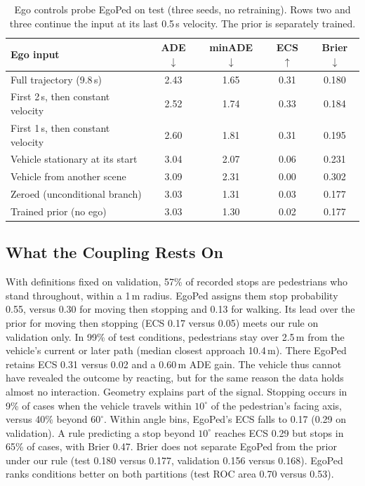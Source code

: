 \documentclass[letterpaper, 10 pt, conference]{ieeeconf}
\newcommand{\method}{EgoPed\xspace}
\begin{document}
\begin{table}[t]
  \centering
  \caption{Ego controls probe \method on test (three seeds, no retraining). Rows two and three continue the input at its last 0.5\,s velocity. The prior is separately trained.}
  \label{tab:controls}
  \vspace{3pt}
  \footnotesize
  \setlength{\tabcolsep}{3pt}
  \begin{tabular}{lcccc}
    \toprule
    Ego input & ADE $\downarrow$ & minADE $\downarrow$ & ECS $\uparrow$ & Brier $\downarrow$ \\
    \midrule
    Full trajectory (9.8\,s) & 2.43 & 1.65 & 0.31 & 0.180 \\
    First 2\,s, then constant velocity & 2.52 & 1.74 & 0.33 & 0.184 \\
    First 1\,s, then constant velocity & 2.60 & 1.81 & 0.31 & 0.195 \\
    Vehicle stationary at its start & 3.04 & 2.07 & 0.06 & 0.231 \\
    Vehicle from another scene & 3.09 & 2.31 & 0.00 & 0.302 \\
    Zeroed (unconditional branch) & 3.03 & 1.31 & 0.03 & 0.177 \\
    \midrule
    Trained prior (no ego) & 3.03 & 1.30 & 0.02 & 0.177 \\
    \bottomrule
  \end{tabular}
\end{table}

\subsection{What the Coupling Rests On}
\label{sec:rests}

With definitions fixed on validation, 57\% of recorded stops are pedestrians who stand throughout, within a 1\,m radius. \method assigns them stop probability 0.55, versus 0.30 for moving then stopping and 0.13 for walking. Its lead over the prior for moving then stopping (ECS 0.17 versus 0.05) meets our rule on validation only.
In 99\% of test conditions, pedestrians stay over 2.5\,m from the vehicle's current or later path (median closest approach 10.4\,m). There \method retains ECS 0.31 versus 0.02 and a 0.60\,m ADE gain. The vehicle thus cannot have revealed the outcome by reacting, but for the same reason the data holds almost no interaction.
Geometry explains part of the signal. Stopping occurs in 9\% of cases when the vehicle travels within $10^\circ$ of the pedestrian's facing axis, versus 40\% beyond $60^\circ$. Within angle bins, \method's ECS falls to 0.17 (0.29 on validation). A rule predicting a stop beyond $10^\circ$ reaches ECS 0.29 but stops in 65\% of cases, with Brier 0.47.
Brier does not separate \method from the prior under our rule (test 0.180 versus 0.177, validation 0.156 versus 0.168). \method ranks conditions better on both partitions (test ROC area 0.70 versus 0.53).
\end{document}
